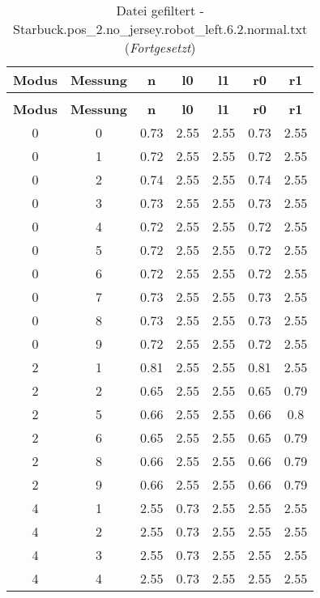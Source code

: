 \begin{longtable}{|c|c||c||c|c||c|c|}
	\caption{Datei gefiltert - Starbuck.pos\_2.no\_jersey.robot\_left.6.2.normal.txt} \label{tab:Starbuck.pos-2.no-jersey.robot-left.6.2.normal.txt} \\ \hline
	\textbf{Modus} & \textbf{Messung} & \textbf{n} & \textbf{l0} & \textbf{l1} & \textbf{r0} & \textbf{r1}\\ \hline
	\endfirsthead
	\caption[]{Datei gefiltert - Starbuck.pos\_2.no\_jersey.robot\_left.6.2.normal.txt (\emph{Fortgesetzt})} \\ \hline
	\textbf{Modus} & \textbf{Messung} & \textbf{n} & \textbf{l0} & \textbf{l1} & \textbf{r0} & \textbf{r1}\\ \hline
	\endhead
	0 & 0 & 0.73 & 2.55 & 2.55 & 0.73 & 2.55 \\ \hline
	0 & 1 & 0.72 & 2.55 & 2.55 & 0.72 & 2.55 \\ \hline
	0 & 2 & 0.74 & 2.55 & 2.55 & 0.74 & 2.55 \\ \hline
	0 & 3 & 0.73 & 2.55 & 2.55 & 0.73 & 2.55 \\ \hline
	0 & 4 & 0.72 & 2.55 & 2.55 & 0.72 & 2.55 \\ \hline
	0 & 5 & 0.72 & 2.55 & 2.55 & 0.72 & 2.55 \\ \hline
	0 & 6 & 0.72 & 2.55 & 2.55 & 0.72 & 2.55 \\ \hline
	0 & 7 & 0.73 & 2.55 & 2.55 & 0.73 & 2.55 \\ \hline
	0 & 8 & 0.73 & 2.55 & 2.55 & 0.73 & 2.55 \\ \hline
	0 & 9 & 0.72 & 2.55 & 2.55 & 0.72 & 2.55 \\ \hline
	2 & 1 & 0.81 & 2.55 & 2.55 & 0.81 & 2.55 \\ \hline
	2 & 2 & 0.65 & 2.55 & 2.55 & 0.65 & 0.79 \\ \hline
	2 & 5 & 0.66 & 2.55 & 2.55 & 0.66 & 0.8 \\ \hline
	2 & 6 & 0.65 & 2.55 & 2.55 & 0.65 & 0.79 \\ \hline
	2 & 8 & 0.66 & 2.55 & 2.55 & 0.66 & 0.79 \\ \hline
	2 & 9 & 0.66 & 2.55 & 2.55 & 0.66 & 0.79 \\ \hline
	4 & 1 & 2.55 & 0.73 & 2.55 & 2.55 & 2.55 \\ \hline
	4 & 2 & 2.55 & 0.73 & 2.55 & 2.55 & 2.55 \\ \hline
	4 & 3 & 2.55 & 0.73 & 2.55 & 2.55 & 2.55 \\ \hline
	4 & 4 & 2.55 & 0.73 & 2.55 & 2.55 & 2.55 \\ \hline

\end{longtable}
